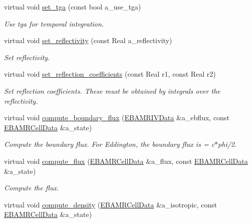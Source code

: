 \begin{DoxyCompactItemize}
virtual void \hyperlink{classeddington__sp1_ae387df9f33e60748a2292c1b828714bb}{set\+\_\+tga} (const bool a\+\_\+use\+\_\+tga)
\begin{DoxyCompactList}\small\item\em Use tga for temporal integration. \end{DoxyCompactList}\item 
virtual void \hyperlink{classeddington__sp1_a5abda50a73b35d2cb8b4c2b9f0f52cac}{set\+\_\+reflectivity} (const Real a\+\_\+reflectivity)
\begin{DoxyCompactList}\small\item\em Set reflectivity. \end{DoxyCompactList}\item 
virtual void \hyperlink{classeddington__sp1_afadf0ab343981d7bd28c7a524f9ab357}{set\+\_\+reflection\+\_\+coefficients} (const Real r1, const Real r2)
\begin{DoxyCompactList}\small\item\em Set reflection coefficients. These must be obtained by integrals over the reflectivity. \end{DoxyCompactList}\item 
virtual void \hyperlink{classeddington__sp1_a455c8dbab4307361220674bc0f6835c4}{compute\+\_\+boundary\+\_\+flux} (\hyperlink{type__definitions_8H_a6b8fa905d55cbb491b52180386f0e0c1}{E\+B\+A\+M\+R\+I\+V\+Data} \&a\+\_\+ebflux, const \hyperlink{type__definitions_8H_a7e610f301989e5e07781c5e338bdb7c3}{E\+B\+A\+M\+R\+Cell\+Data} \&a\+\_\+state)
\begin{DoxyCompactList}\small\item\em Compute the boundary flux. For Eddington, the boundary flux is = c$\ast$phi/2. \end{DoxyCompactList}\item 
virtual void \hyperlink{classeddington__sp1_af6d7ca2f75f1175062c3f9b37d6ec757}{compute\+\_\+flux} (\hyperlink{type__definitions_8H_a7e610f301989e5e07781c5e338bdb7c3}{E\+B\+A\+M\+R\+Cell\+Data} \&a\+\_\+flux, const \hyperlink{type__definitions_8H_a7e610f301989e5e07781c5e338bdb7c3}{E\+B\+A\+M\+R\+Cell\+Data} \&a\+\_\+state)
\begin{DoxyCompactList}\small\item\em Compute the flux. \end{DoxyCompactList}\item 
virtual void \hyperlink{classeddington__sp1_a55ce6a698fcea55c1a025d01a61e42e8}{compute\+\_\+density} (\hyperlink{type__definitions_8H_a7e610f301989e5e07781c5e338bdb7c3}{E\+B\+A\+M\+R\+Cell\+Data} \&a\+\_\+isotropic, const \hyperlink{type__definitions_8H_a7e610f301989e5e07781c5e338bdb7c3}{E\+B\+A\+M\+R\+Cell\+Data} \&a\+\_\+state)

\end{DoxyCompactItemize}
